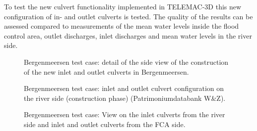 To test the new culvert functionality implemented in TELEMAC-3D this new configuration of in- and outlet culverts is tested.
The quality of the results can be assessed compared to measurements of the mean water levels inside the flood control area,
outlet discharges, inlet discharges and mean water levels in the river side.

\begin{figure}[H]
\begin{center}
\end{center}
\caption{Bergenmeersen test case: detail of the side view of
the construction of the new inlet and outlet culverts in Bergenmeersen.}
\label{fig:bergenmeersen_figure1}
\end{figure}

\begin{figure}[H]
\begin{center}
\end{center}
\caption{Bergenmeersen test case: inlet and outlet culvert configuration on the river side (construction phase) (Patrimoniumdatabank W\&Z).}
\label{fig:bergenmeersen_figure2}
\end{figure}

\begin{figure}[H]
\begin{center}
\end{center}
\caption{Bergenmeersen test case: View on the inlet culverts from the river side and inlet and outlet culverts from the FCA side.}
\label{fig:bergenmeersen_figure3}
\end{figure}

